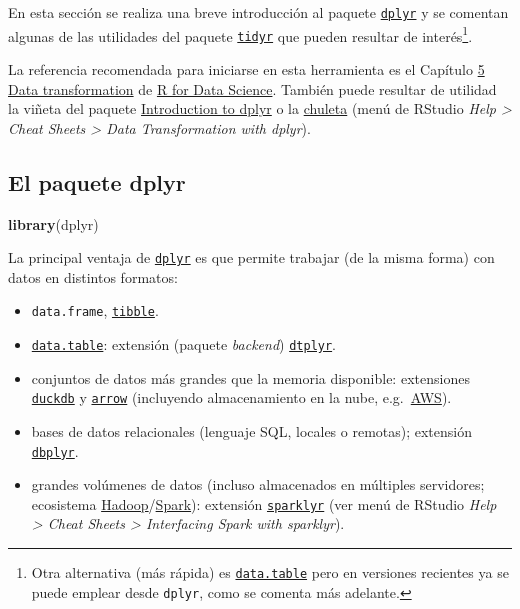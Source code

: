 \documentclass[
]{book}
\newenvironment{Shaded}{\begin{snugshade}}{\end{snugshade}}
\newcommand{\FunctionTok}[1]{\textcolor[rgb]{0.13,0.29,0.53}{\textbf{#1}}}
\newcommand{\NormalTok}[1]{#1}
\begin{document}
En esta sección se realiza una breve introducción al paquete \href{https://dplyr.tidyverse.org}{\texttt{dplyr}} y se comentan algunas de las utilidades del paquete \href{https://tidyr.tidyverse.org}{\texttt{tidyr}} que pueden resultar de interés\footnote{Otra alternativa (más rápida) es \href{https://rdatatable.gitlab.io/data.table}{\texttt{data.table}} pero en versiones recientes ya se puede emplear desde \texttt{dplyr}, como se comenta más adelante.}.

La referencia recomendada para iniciarse en esta herramienta es el Capítulo \href{http://r4ds.had.co.nz/transform.html}{5 Data transformation} de
\href{http://r4ds.had.co.nz}{R for Data Science}.
También puede resultar de utilidad la viñeta del paquete \href{https://dplyr.tidyverse.org/articles/dplyr.html}{Introduction to dplyr} o la \href{https://posit.co/wp-content/uploads/2022/10/data-transformation-1.pdf}{chuleta} (menú de RStudio \emph{Help \textgreater{} Cheat Sheets \textgreater{} Data Transformation with dplyr}).

\subsection{El paquete dplyr}\label{dplyr-pkg}

\begin{Shaded}
\begin{Highlighting}[]
\FunctionTok{library}\NormalTok{(dplyr)}
\end{Highlighting}
\end{Shaded}

La principal ventaja de \href{https://dplyr.tidyverse.org/index.html}{\texttt{dplyr}} es que permite trabajar (de la misma forma) con datos en distintos formatos:

\begin{itemize}
\item
  \texttt{data.frame}, \href{https://tibble.tidyverse.org/}{\texttt{tibble}}.
\item
  \href{https://rdatatable.gitlab.io/data.table}{\texttt{data.table}}: extensión (paquete \emph{backend}) \href{https://dtplyr.tidyverse.org}{\texttt{dtplyr}}.
\item
  conjuntos de datos más grandes que la memoria disponible: extensiones \href{https://duckdb.org/docs/api/r}{\texttt{duckdb}} y \href{https://arrow.apache.org/docs/r/}{\texttt{arrow}} (incluyendo almacenamiento en la nube, e.g.~\href{https://aws.amazon.com/es/s3}{AWS}).
\item
  bases de datos relacionales (lenguaje SQL, locales o remotas); extensión \href{https://dbplyr.tidyverse.org}{\texttt{dbplyr}}.
\item
  grandes volúmenes de datos (incluso almacenados en múltiples servidores; ecosistema \href{http://hadoop.apache.org/}{Hadoop}/\href{https://spark.apache.org/}{Spark}): extensión \href{https://spark.rstudio.com}{\texttt{sparklyr}} (ver menú de RStudio \emph{Help \textgreater{} Cheat Sheets \textgreater{} Interfacing Spark with sparklyr}).
\end{itemize}
\end{document}

